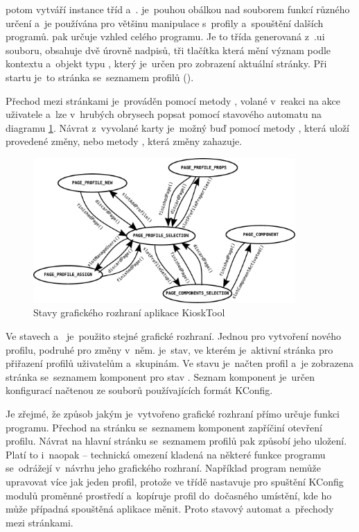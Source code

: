  potom vytváří instance tříd  a~.  je~pouhou obálkou nad souborem funkcí různého určení a~je používána pro většinu manipulace s~profily a~spouštění dalších programů.  pak určuje vzhled celého programu. Je to třída generovaná z~.ui souboru, obsahuje dvě úrovně nadpisů, tři tlačítka která mění význam podle kontextu a~objekt typu , který je~určen pro zobrazení aktuální stránky. Při startu je~to stránka se~seznamem profilů ().

Přechod mezi stránkami je~prováděn pomocí metody , volané v~reakci na akce uživatele a~lze v~hrubých obrysech popsat pomocí stavového automatu na diagramu \ref{fig:kioskstates}. Návrat z~vyvolané karty je~možný buď pomocí metody , která uloží provedené změny, nebo metody , která změny zahazuje.

\begin{figure}[h]
    \centering
    \includegraphics[width=10cm]{obrazky/stated.pdf}
    \caption{Stavy grafického rozhraní aplikace KioskTool}
    \label{fig:kioskstates}
\end{figure}

Ve stavech  a~ je~použito stejné grafické rozhraní. Jednou pro vytvoření nového profilu, podruhé pro změny v~něm.\linebreak {} je~stav, ve kterém je~aktivní stránka pro přiřazení profilů uživatelům a~skupinám. Ve stavu  je~načten profil a~je zobrazena stránka se~seznamem komponent pro stav . Seznam komponent je~určen konfigurací načtenou ze souborů používajících formát KConfig.

Je zřejmé, že způsob jakým je~vytvořeno grafické rozhraní přímo určuje funkci programu. Přechod na stránku se~seznamem komponent zapříčiní otevření profilu. Návrat na hlavní stránku se~seznamem profilů pak způsobí jeho uložení. Platí to i~naopak -- technická omezení kladená na některé funkce programu se~odrážejí v~návrhu jeho grafického rozhraní. Například program nemůže upravovat více jak jeden profil, protože ve třídě  nastavuje pro spuštění KConfig modulů proměnné prostředí a~kopíruje profil do~dočasného umístění, kde ho může případná spouštěná aplikace měnit. Proto stavový automat a~přechody mezi stránkami.

